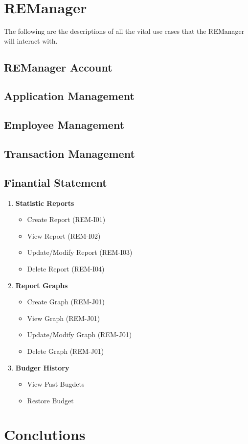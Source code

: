 \documentclass[11pt]{article}
\begin{document}
	\section{REManager}
	\begin{flushleft}
		The following are the descriptions of all the vital use cases that the REManager will interact with. 
	\end{flushleft}
		
		\subsection{REManager Account}
		
		\subsection{Application Management}
		
		\subsection{Employee Management}
		
		\subsection{Transaction Management}
		
		\subsection{Finantial Statement}
	
		\begin{enumerate}[i]
			\item \textbf{Statistic Reports}
			\begin{itemize}
				\item Create Report (REM-I01)
				\item View Report (REM-I02)
				\item Update/Modify Report (REM-I03)
				\item Delete Report (REM-I04)
			\end{itemize}
			
			\item \textbf{Report Graphs}
			\begin{itemize}
				\item Create Graph (REM-J01)
				\item View Graph (REM-J01)
				\item Update/Modify Graph (REM-J01)
				\item Delete Graph (REM-J01)
			\end{itemize}
			
			\item \textbf{Budger History}
			\begin{itemize}
				\item View Past Bugdets
				\item Restore Budget
			\end{itemize}
			
		\end{enumerate}
	
	\section{Conclutions}
	
	
\end{document}
